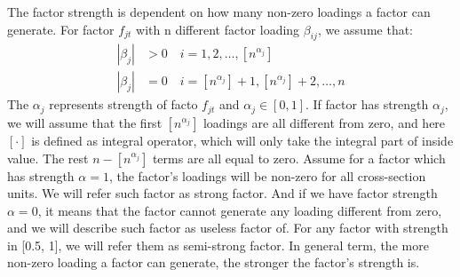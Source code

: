 \documentclass[12pt]{article}
\begin{document}
The factor strength is dependent on how many non-zero loadings a factor can generate.
For factor $f_{jt}$ with n different factor loading $\beta_{ij}$, we assume that:
\begin{align*}
|\beta_{j}| &> 0\quad i = 1, 2,  \dots, [n^{\alpha_j}]\\
|\beta_{j}| &= 0 \quad i = [n^{\alpha_j}] + 1, [n^{\alpha_j}] +2 ,\dots, n
\end{align*}
The $\alpha_j$ represents strength of facto $f_{jt}$ and $\alpha_j \in [0,1]$.
If factor has strength $\alpha_j$, we will assume that the first $[n^{\alpha_j}]$ loadings are all different from zero, and here $[\cdot] $  is defined as integral operator, which will only take the integral part of inside value.%
The rest $n - [n^{\alpha_j}]$ terms are all equal to zero. %
Assume for a factor which has strength $\alpha = 1$, the factor's loadings will be non-zero for all cross-section units.
We will refer such factor as strong factor.
And if we have factor strength $\alpha = 0$, it means that the factor cannot generate any loading different from zero, and we will describe such factor as useless factor of.
For any factor with strength in [0.5, 1], we will refer them as semi-strong factor.
In general term, the more non-zero loading a factor can generate, the stronger the factor's strength is. 




\end{document}
